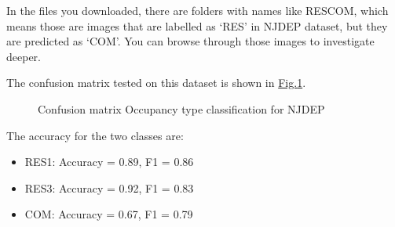 \documentclass[letterpaper,10pt,english]{sphinxmanual}
\begin{document}
\begin{sphinxVerbatim}[commandchars=\\\{\}]
          
           

             

\end{sphinxVerbatim}

\sphinxAtStartPar
In the files you downloaded, there are folders with names like RES\sphinxhyphen{}COM, which means those are images that are labelled as ‘RES’ in NJDEP dataset,
but they are predicted as ‘COM’. You can browse through those images to investigate deeper.

\sphinxAtStartPar
The confusion matrix tested on this dataset is shown in \hyperref[\detokenize{common/technical_manual/occupancy:fig-confusion-occupancy-njdep-v2}]{Fig.\@ \ref{\detokenize{common/technical_manual/occupancy:fig-confusion-occupancy-njdep-v2}}}.

\begin{figure}[htbp]
\centering
\capstart

\noindent{}
\caption{Confusion matrix \sphinxhyphen{} Occupancy type classification for NJDEP}\label{\detokenize{common/technical_manual/occupancy:id3}}\label{\detokenize{common/technical_manual/occupancy:fig-confusion-occupancy-njdep-v2}}\end{figure}

\sphinxAtStartPar
The accuracy for the two classes are:
\begin{itemize}
\item {} 
\sphinxAtStartPar
RES1: Accuracy = 0.89, F1 = 0.86

\item {} 
\sphinxAtStartPar
RES3: Accuracy = 0.92, F1 = 0.83

\item {} 
\sphinxAtStartPar
COM: Accuracy = 0.67, F1 = 0.79

\end{itemize}
\end{document}
